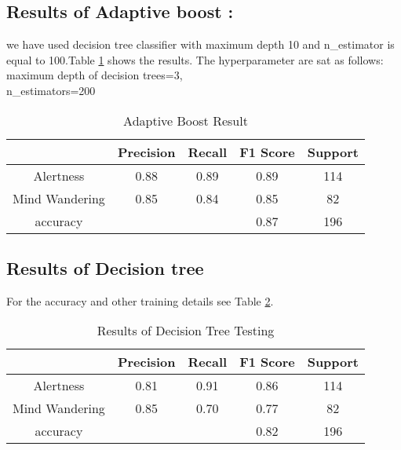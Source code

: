 \subsection{Results of Adaptive boost  :}
we have used decision tree classifier with maximum depth 10 and n\_estimator is equal to 100.Table \ref{tab:adaboost_res} shows the results.
The hyperparameter are sat as follows:\\
maximum depth of decision trees=3,\\
n\_estimators=200\\
\begin{table}[ht]
    \centering
    \caption{Adaptive Boost Result}
    {\renewcommand{\arraystretch}{1.2}
    \begin{tabular}{ccccc}
            \hline
            \hline
             & Precision & Recall & F1 Score & Support \\ 
            \hline
              Alertness   & 0.88 & 0.89 & 0.89 & 114  \\
              Mind Wandering   & 0.85 & 0.84 & 0.85 & 82 \\
              accuracy &  &  & 0.87 & 196 \\
              \hline
              \hline
        \end{tabular}
    }
    
    \label{tab:adaboost_res}
\end{table}

\subsection{Results of Decision tree}
For the accuracy and other training details see Table \ref{tab:decison_tree_res}.
\begin{center}
    \begin{table}[ht]
    \centering
    \caption{Results of Decision Tree Testing}
    {\renewcommand{\arraystretch}{1.2}
    \begin{tabular}{ccccc}
       \hline
       \hline
         & Precision & Recall & F1 Score & Support \\
        \hline
          
         Alertness      & 0.81   &   0.91     & 0.86     &  114 \\
         Mind Wandering      & 0.85   &   0.70     & 0.77      &  82 \\
    accuracy      &        &           & 0.82     &  196 \\
 
          \hline
          \hline
    \end{tabular}
    }
    \label{tab:decison_tree_res}
\end{table}
\end{center}


